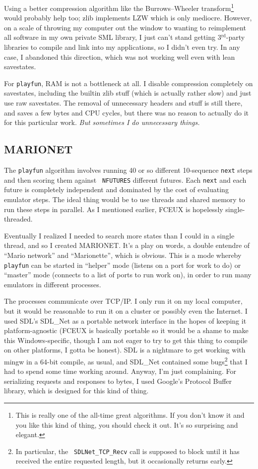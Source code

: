 \documentclass[twocolumn]{article}
\newcommand\rd{$^{\mathrm{rd}}$}
\begin{document}
Using a better compression algorithm like the Burrows--Wheeler
transform\cite{Burrows}\footnote{This is really one of the all-time
  great algorithms. If you don't know it and you like this kind of
  thing, you should check it out. It's so surprising and elegant.}
would probably help too; zlib implements LZW which is only mediocre.
However, on a scale of throwing my computer out the window to wanting
to reimplement all software in my own private SML library, I just
can't stand getting 3\rd-party libraries to compile and link into my
applications, so I didn't even try. In any case, I abandoned this
direction, which was not working well even with lean savestates.

For {\tt playfun}, RAM is not a bottleneck at all. I disable
compression completely on savestates, including the builtin zlib stuff
(which is actually rather slow) and just use raw savestates. The
removal of unnecessary headers and stuff is still there, and saves a
few bytes and CPU cycles, but there was no reason to actually do it
for this particular work. {\em But sometimes I do unnecessary things.}

\subsection{MARIONET}

The {\tt playfun} algorithm involves running 40 or so different
10-sequence {\tt next} steps and then scoring them against {\tt
  NFUTURES} different futures. Each {\tt next} and each future is
completely independent and dominated by the cost of evaluating
emulator steps. The ideal thing would be to use threads and shared
memory to run these steps in parallel. As I mentioned earlier,
FCEUX is hopelessly single-threaded.

Eventually I realized I needed to search more states than I could in a
single thread, and so I created MARIONET. It's a play on words, a
double entendre of ``Mario network'' and ``Marionette'', which is
obvious. This is a mode whereby {\tt playfun} can be started in
``helper'' mode (listens on a port for work to do) or ``master'' mode
(connects to a list of ports to run work on), in order to run
many emulators in different processes.

The processes communicate over TCP/IP. I only run it on my local
computer, but it would be reasonable to run it on a cluster or
possibly even the Internet. I used SDL's SDL\_Net as a portable
network interface in the hopes of keeping it platform-agnostic (FCEUX
is basically portable so it would be a shame to make this
Windows-specific, though I am not eager to try to get this thing to
compile on other platforms, I gotta be honest). SDL is a nightmare to
get working with mingw in a 64-bit compile, as usual, and SDL\_Net
contained some bugs\footnote{In particular, the {\tt
    SDLNet\_TCP\_Recv} call is supposed to block until it has received
  the entire requested length, but it occasionally returns early.}
that I had to spend some time working around. Anyway, I'm just
complaining. For serializing requests and responses to bytes, I used
Google's Protocol Buffer library\cite{ProtoBuf}, which is designed for
this kind of thing.
\end{document}
